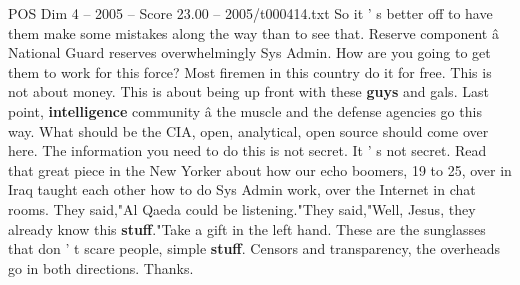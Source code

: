 \begin{textsample}{POS Dim 4 – 2005 – Score 23.00 – 2005/t000414.txt}
So it ' s better off to have them make some mistakes along the way than to see that.
Reserve component â National Guard reserves overwhelmingly Sys Admin.
How are you going to get them to work for this force?
Most firemen in this country do it for free.
This is not about money.
This is about being up front with these \textbf{guys} and gals.
Last point, \textbf{intelligence} community â the muscle and the defense agencies go this way.
What should be the CIA, open, analytical, open source should come over here.
The information you need to do this is not secret.
It ' s not secret.
Read that great piece in the New Yorker about how our echo boomers, 19 to 25, over in Iraq taught each other how to do Sys Admin work, over the Internet in chat rooms.
They said,"Al Qaeda could be listening."They said,"Well, Jesus, they already know this \textbf{stuff}."Take a gift in the left hand.
These are the sunglasses that don ' t scare people, simple \textbf{stuff}.
Censors and transparency, the overheads go in both directions.
Thanks.

\end{textsample}
